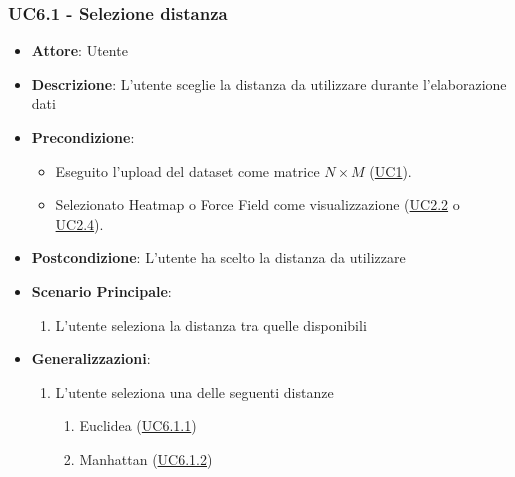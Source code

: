     \subsubsection{UC6.1 - Selezione distanza}
    \label{uc6.1}
    \begin{itemize}
    \item \textbf{Attore}: Utente
    \item \textbf{Descrizione}: L'utente sceglie la distanza da utilizzare durante l'elaborazione dati
    \item \textbf{Precondizione}: 
    \begin{itemize}
        \item Eseguito l'upload del dataset come matrice $N\times M$ (\hyperref[uc1]{UC1}).
        \item Selezionato Heatmap o Force Field come visualizzazione (\hyperref[uc2.2]{UC2.2} o \hyperref[uc2.4]{UC2.4}).
    \end{itemize}  
    \item \textbf{Postcondizione}: L'utente ha scelto la distanza da utilizzare
    \item \textbf{Scenario Principale}: 
    \begin{enumerate}
        \item L'utente seleziona la distanza tra quelle disponibili
    \end{enumerate}
    \item \textbf{Generalizzazioni}:
        \begin{enumerate}
            \item L'utente seleziona una delle seguenti distanze
                \begin{enumerate}
                    \item Euclidea (\hyperref[uc6.1.1]{UC6.1.1})
                    \item Manhattan (\hyperref[uc6.1.2]{UC6.1.2})
                \end{enumerate}
        \end{enumerate}  
    \end{itemize}
    
